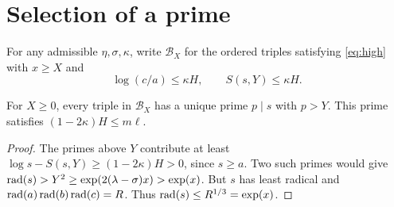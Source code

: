 \section{Selection of a prime}\label{sec:sel}
For any admissible $\eta,\sigma,\kappa$, write $\mathcal B_X$ for the
ordered triples satisfying \eqref{eq:high} with $x\ge X$ and
\[
            \log(c/a)\le\kappa H,\qquad S(s,Y)\le\kappa H .
\]
\begin{proposition}\label{lem:sel}
For $X\ge0$, every triple in $\mathcal B_X$ has a unique prime $p\mid s$
with $p>Y$. This prime satisfies $(1-2\kappa)H\le m\ell$.
\end{proposition}
\begin{proof}
The primes above $Y$ contribute at least
$\log s-S(s,Y)\ge(1-2\kappa)H>0$, since $s\ge a$.
Two such primes would give $\operatorname{rad}(s)>Y^2\ge\exp(2(\lambda-\sigma)x)>\exp(x)$.
But $s$ has least radical and $\operatorname{rad}(a)\operatorname{rad}(b)\operatorname{rad}(c)=R$.
Thus $\operatorname{rad}(s)\le R^{1/3}=\exp(x)$.
\end{proof}
